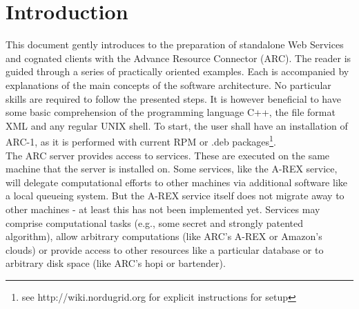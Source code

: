 
\chapter{Introduction}

This document gently introduces to the preparation of standalone Web Services and cognated clients with the Advance Resource Connector (ARC).
The reader is guided through a series of practically oriented examples.
Each is accompanied by explanations of the main concepts of the software architecture.
No particular skills are required to follow the presented steps.
It is however beneficial to have some basic comprehension of the programming language C++, the file format XML and any regular UNIX shell.
To start, the user shall have an installation of ARC-1, as it is performed with current RPM or .deb packages\footnote{see http://wiki.nordugrid.org for explicit instructions for setup}.\\


The ARC server provides access to services.
These are executed on the same machine that the server is installed on.
Some services, like the A-REX service, will delegate computational efforts to other machines
via additional software like a local queueing system.
But the A-REX service itself does not migrate away to other machines - at least this
has not been implemented yet.
Services may comprise computational tasks (e.g., some secret and strongly
patented algorithm), allow arbitrary computations (like ARC's A-REX or
Amazon's clouds) or provide access to other resources like a particular
database or to arbitrary disk space (like ARC's hopi or bartender).\\



